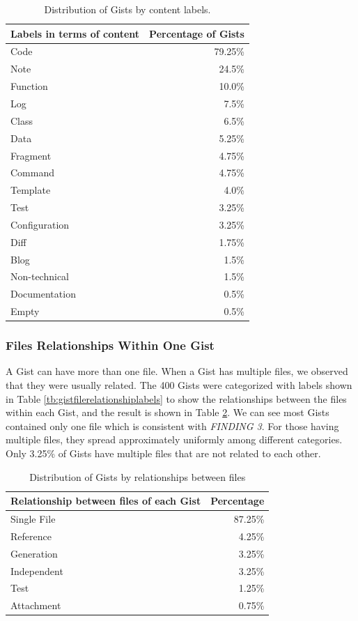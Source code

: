 \begin{table}[!htb]
 \begin{center}
 \begin{tabular}{@{}lr} \hline
    \textbf{Labels in terms of content}	&	\textbf{Percentage of Gists} \\ \hline
	Code & 79.25\%\\
	Note & 24.5\%\\
	Function & 10.0\%\\
	Log & 7.5\%\\
	Class & 6.5\%\\
	Data & 5.25\%\\
	Fragment & 4.75\%\\
	Command & 4.75\%\\
	Template & 4.0\%\\
	Test & 3.25\%\\
	Configuration & 3.25\%\\
	Diff & 1.75\%\\
	Blog & 1.5\%\\
	Non-technical & 1.5\%\\
	Documentation & 0.5\%\\
	Empty & 0.5\%\\ \hline
 \end{tabular}
 \end{center}
 \caption{Distribution of Gists by content labels.}
 \label{tb:labels}
\end{table}

\subsubsection{Files Relationships Within One Gist}
A Gist can have more than one file. When a Gist has multiple files, we observed that they were usually related. The 400 Gists were categorized with labels shown in Table \ref{tb:gistfilerelationshiplabels} to show the relationships between the files within each Gist, and the result is shown in Table \ref{tb:relationship}. We can see most Gists contained only one file which is consistent with \textit{FINDING 3}. For those having multiple files, they spread approximately uniformly among different categories. Only 3.25\% of Gists have multiple files that are not related to each other. 

\begin{table}[!htb]
 \begin{center}
 \begin{tabular}{lr}
    \textbf{Relationship between files of each Gist}	&	\textbf{Percentage} \\ \hline
	Single File & 87.25\%\\
	Reference & 4.25\%\\
	Generation & 3.25\%\\
	Independent & 3.25\%\\
	Test & 1.25\%\\
	Attachment & 0.75\%\\ \hline
 \end{tabular}
 \end{center}
 \caption{Distribution of Gists by relationships between files}
 \label{tb:relationship}
\end{table}